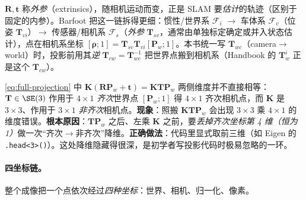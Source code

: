 \noindent $\mathbf{R},\mathbf{t}$ 称\emph{外参}（extrinsics），随相机运动而变，正是 SLAM 要\emph{估计}的轨迹（区别于固定的内参）\cite{gaoxiang2019slam14}。Barfoot\cite{barfoot2024state} 把这一链拆得更细：惯性/世界系 $\mathcal{F}_i$ $\to$ 车体系 $\mathcal{F}_v$（位姿 $\mathbf{T}_{vi}$）$\to$ 传感器/相机系 $\mathcal{F}_s$（\emph{外参} $\mathbf{T}_{sv}$，通常由单独标定确定或并入状态估计），点在相机系坐标 $[\boldsymbol\rho;1]=\mathbf{T}_{sv}\mathbf{T}_{vi}[\mathbf{P}_w;1]$。本书统一写 $\mathbf{T}_{wc}$（camera$\to$world）时，投影前用其\emph{逆} $\mathbf{T}_{cw}=\mathbf{T}_{wc}^{-1}$ 把世界点搬到相机系（Handbook 的 $\mathbf{T}_w^i$ 正是这个 $\mathbf{T}_{cw}$\cite{carlone2026handbook}）。

\begin{pitfall}
\cref{eq:full-projection} 中 $\mathbf{K}(\mathbf{R}\mathbf{P}_w+\mathbf{t})=\mathbf{K}\mathbf{T}\mathbf{P}_w$ 两侧维度并不直接相等：$\mathbf{T}\in\SE(3)$ 作用于 $4\times1$ \emph{齐次}世界点 $[\mathbf{P}_w;1]$ 得 $4\times1$ 齐次相机点，而 $\mathbf{K}$ 是 $3\times3$、作用于 $3\times1$ \emph{非齐次}相机点。\textbf{现象}：照搬 $\mathbf{K}\mathbf{T}\mathbf{P}_w$ 会出现 $3\times3$ 乘 $4\times1$ 的维度错误。\textbf{根本原因}：$\mathbf{T}\mathbf{P}_w$ 之后、左乘 $\mathbf{K}$ 之前，要\emph{丢掉齐次坐标第 4 维（恒为 1）}做一次“齐次$\to$非齐次”降维。\textbf{正确做法}：代码里显式取前三维（如 Eigen 的 \texttt{.head<3>()}）。这处降维隐藏得很深，是初学者写投影代码时极易忽略的一环\cite{gaoxiang2019slam14}。
\end{pitfall}

\paragraph{四坐标链。}
整个成像把一个点依次经过\emph{四种坐标}\cite{gaoxiang2019slam14}：世界、相机、归一化、像素。

